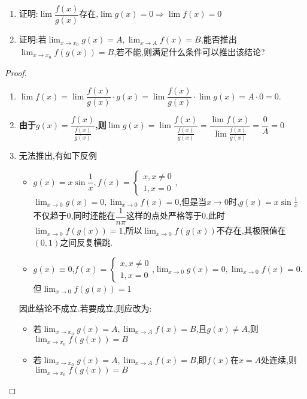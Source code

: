 \documentclass[8pt a4paper, oneside, UTF8]{ctexbook}
\begin{document}
\begin{sloppypar}
\begin{problem}
\begin{enumerate}
        \item 证明:$\lim \dfrac{f(x)}{g(x)}$存在,$\lim g(x)=0 \Rightarrow \lim f(x)=0$
        \item 证明:若$\lim_{x \to x_0}g(x)=A,\lim_{x \to A}f(x)=B$,能否推出$\lim_{x\to x_0}f(g(x))=B$,若不能,则满足什么条件可以推出该结论?
    \end{enumerate}
    \end{problem}
    \begin{proof}
        \begin{enumerate}
            \item $\lim f(x)=\lim\dfrac{f(x)}{g(x)}\cdot g(x)=\lim\dfrac{f(x)}{g(x)}\cdot\lim g(x)=A\cdot0=0.$
            \item \textbf{由于$g(x)=\dfrac{f(x)}{\frac{f(x)}{g(x)}}$,则$\lim g(x)=\lim\dfrac{f(x)}{\frac{f(x)}{g(x)}}=\dfrac{\lim f(x)}{\lim\frac{f(x)}{g(x)}}=\dfrac{0}{A}=0$}
            \item 无法推出,有如下反例
                  \begin{itemize}
                      \item $g(x)=x \sin \dfrac{1}{x},f(x)=\begin{cases} x,x \neq 0\\1,x=0 \end{cases}$,$\lim_{x \to 0}g(x)=0,\lim_{x\to0}f(x)=0$,但是当$x \to 0$时,$g(x)=x\sin \frac{1}{x}$不仅趋于0,同时还能在$\dfrac{1}{n \pi}$这样的点处严格等于0.此时$\lim_{x \to 0}f(g(x))=1$,所以$\lim_{x\to 0}f(g(x))$不存在,其极限值在$(0,1)$之间反复横跳.
                      \item $g(x) \equiv 0$,$f(x)=\begin{cases} x,x \neq 0\\ 1,x=0 \end{cases}$,$\lim_{x\to 0}g(x)=0,\lim_{x\to 0}f(x)=0.$但$\lim_{x\to 0}f(g(x))=1$
                  \end{itemize}
                  因此结论不成立.若要成立,则应改为:
                  \begin{itemize}
                      \item 若$\lim_{x \to x_0}g(x)=A,\lim_{x\to A}f(x)=B$,且$g(x)\neq A$,则$\lim_{x\to x_0}f(g(x))=B$
                      \item 若$\lim_{x \to x_0}g(x)=A,\lim_{x\to A}f(x)=B$,即$f(x)$在$x=A$处连续,则$\lim_{x\to x_0}f(g(x))=B$
                  \end{itemize}
        \end{enumerate}
    \end{proof}

\end{sloppypar}
\end{document}
